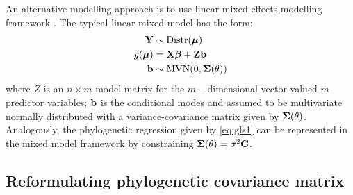 An alternative modelling approach is to use linear mixed effects modelling framework \citep{lynch1991methods}.
The typical linear mixed model has the form:
\begin{align}
{\mathbf Y} & \sim \textrm{Distr}({\boldsymbol \mu}) \label{eq:glmm1} \\
g({\boldsymbol \mu}) & = {\mathbf X} {\boldsymbol \beta} + {\mathbf Z} {\mathbf b} \label{eq:glmm2} \\
{\mathbf b} & \sim \textrm{MVN}(0, {\boldsymbol \Sigma}(\theta)) \label{eq:glmm3}
\end{align}
where $Z$ is an $n \times m$ model matrix for the $m$ -- dimensional vector-valued $m$ predictor variables; ${\mathbf b}$ is the conditional modes and assumed to be multivariate normally distributed with a variance-covariance matrix given by ${\boldsymbol \Sigma}(\theta)$.
Analogously, the phylogenetic regression given by \ref{eq:gls1} can be represented in the mixed model framework by constraining ${\boldsymbol \Sigma}(\theta) = \sigma^2 {\mathbf C}$.


\subsection{Reformulating phylogenetic covariance matrix}


\newcommand{\bS}{{\mathbf S}}
\newcommand{\bJ}{{\mathbf J}}
\newcommand{\bB}{{\mathbf B}}
\newcommand{\bBadj}{{\mathbf B}_{\mbox{\tiny adj}}}
\newcommand{\bomega}{{\boldsymbol \omega}}
\newcommand{\bell}{{\boldsymbol \ell}}
\newcommand{\e}{{ \epsilon}}

